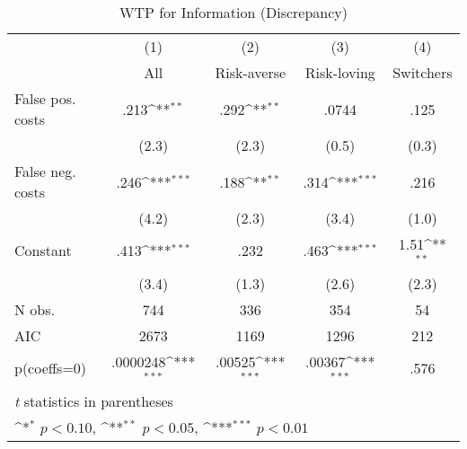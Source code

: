 \begin{table}[htbp]\centering
\def\sym#1{\ifmmode^{#1}\else\(^{#1}\)\fi}
\caption{WTP for Information (Discrepancy)}
\begin{tabular}{l*{4}{c}}
\hline\hline
                &\multicolumn{1}{c}{(1)}&\multicolumn{1}{c}{(2)}&\multicolumn{1}{c}{(3)}&\multicolumn{1}{c}{(4)}\\
                &\multicolumn{1}{c}{All}&\multicolumn{1}{c}{Risk-averse}&\multicolumn{1}{c}{Risk-loving}&\multicolumn{1}{c}{Switchers}\\
\hline
False pos. costs&     .213\sym{**} &     .292\sym{**} &    .0744         &     .125         \\
                &    (2.3)         &    (2.3)         &    (0.5)         &    (0.3)         \\
False neg. costs&     .246\sym{***}&     .188\sym{**} &     .314\sym{***}&     .216         \\
                &    (4.2)         &    (2.3)         &    (3.4)         &    (1.0)         \\
Constant        &     .413\sym{***}&     .232         &     .463\sym{***}&     1.51\sym{**} \\
                &    (3.4)         &    (1.3)         &    (2.6)         &    (2.3)         \\
\hline
N obs.          &      744         &      336         &      354         &       54         \\
AIC             &     2673         &     1169         &     1296         &      212         \\
p(coeffs=0)     & .0000248\sym{***}&   .00525\sym{***}&   .00367\sym{***}&     .576         \\
\hline\hline
\multicolumn{5}{l}{\footnotesize \textit{t} statistics in parentheses}\\
\multicolumn{5}{l}{\footnotesize \sym{*} \(p<0.10\), \sym{**} \(p<0.05\), \sym{***} \(p<0.01\)}\\
\end{tabular}
\end{table}
